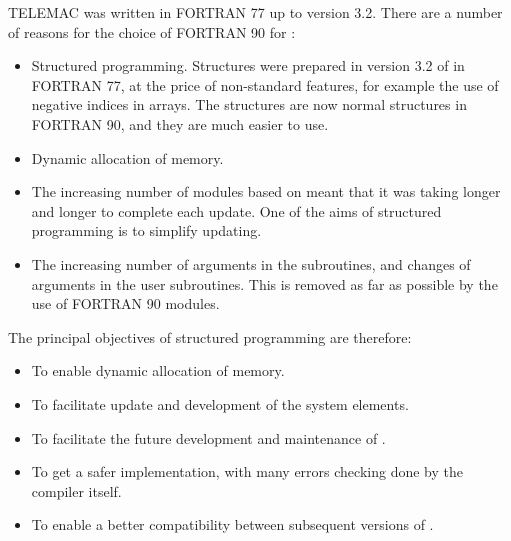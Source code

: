 TELEMAC was written in FORTRAN 77 up to version 3.2. There are a number of
reasons for the choice of FORTRAN 90 for \bief:
\begin{itemize}
\item Structured programming. Structures were prepared in version 3.2 of \bief
  in FORTRAN 77, at the price of non-standard features, for example the use of
  negative indices in arrays. The structures are now normal structures in
  FORTRAN 90, and they are much easier to use.
\item Dynamic allocation of memory.
\item The increasing number of modules based on \bief meant that it was taking
  longer and longer to complete each update. One of the aims of structured
  programming is to simplify updating.
\item The increasing number of arguments in the subroutines, and changes of
  arguments in the user subroutines. This is removed as far as possible
  by the use of FORTRAN 90 modules.
\end{itemize}
The principal objectives of structured programming are therefore:
\begin{itemize}
\item To enable dynamic allocation of memory.
\item To facilitate update and development of the system elements.
\item To facilitate the future development and maintenance of \bief.
\item To get a safer implementation, with many errors checking done by the
  compiler itself.
\item To enable a better compatibility between subsequent versions of \bief.
\end{itemize}
%
%



